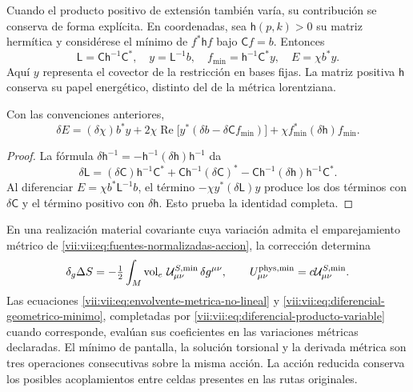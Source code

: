 Cuando el producto positivo de extensión también varía, su
contribución se conserva de forma explícita. En coordenadas, sea
\(\mathsf h(p,k)>0\) su matriz hermítica y considérese el mínimo
de \(f^*\mathsf h f\) bajo \(\mathsf C f=b\). Entonces
\begin{equation}
 \mathsf L=\mathsf C\mathsf h^{-1}\mathsf C^*,\quad
 y=\mathsf L^{-1}b,\quad
 f_{\min}=\mathsf h^{-1}\mathsf C^*y,\quad
 E=\chi b^*y.
 \label{vii:vii:eq:minimo-producto-variable}
\end{equation}
Aquí \(y\) representa el covector de la restricción en bases
fijas. La matriz positiva \(\mathsf h\) conserva su papel
energético, distinto del de la métrica lorentziana.

\begin{lemma}
\label{vii:vii:lem:producto-variable-extension}
Con las convenciones anteriores,
\begin{equation}
 \delta E=(\delta\chi)b^*y
   +2\chi\operatorname{Re}\bigl[y^*(\delta b-\delta\mathsf C f_{\min})\bigr]
   +\chi f_{\min}^*(\delta\mathsf h)f_{\min}.
 \label{vii:vii:eq:diferencial-producto-variable}
\end{equation}
\end{lemma}
\begin{proof}
La fórmula \(\delta\mathsf h^{-1}
=-\mathsf h^{-1}(\delta\mathsf h)\mathsf h^{-1}\) da
\[
 \delta\mathsf L=(\delta\mathsf C)\mathsf h^{-1}\mathsf C^*
 +\mathsf C\mathsf h^{-1}(\delta\mathsf C)^*
 -\mathsf C\mathsf h^{-1}(\delta\mathsf h)
                              \mathsf h^{-1}\mathsf C^*.
\]
Al diferenciar \(E=\chi b^*\mathsf L^{-1}b\), el término
\(-\chi y^*(\delta\mathsf L)y\) produce los dos términos
con \(\delta\mathsf C\) y el término positivo con
\(\delta\mathsf h\). Esto prueba la identidad completa.
\end{proof}

En una realización material covariante cuya variación admita el
emparejamiento métrico de
\eqref{vii:vii:eq:fuentes-normalizadas-accion}, la corrección determina
\begin{equation}
 \delta_g\Delta S
 =-\tfrac12\int_M\operatorname{vol}_e\,
          \mathcal U^{S,\min}_{\mu\nu}\,\delta g^{\mu\nu},
 \qquad U^{\rm phys,\min}_{\mu\nu}
                      =c\mathcal U^{S,\min}_{\mu\nu}.
 \label{vii:vii:eq:fuente-metrica-minimo-no-lineal}
\end{equation}
Las ecuaciones \eqref{vii:vii:eq:envolvente-metrica-no-lineal} y
\eqref{vii:vii:eq:diferencial-geometrico-minimo}, completadas por
\eqref{vii:vii:eq:diferencial-producto-variable} cuando corresponde,
evalúan sus coeficientes en las variaciones métricas declaradas.
El mínimo de pantalla, la solución torsional y la derivada métrica
son tres operaciones consecutivas sobre la misma acción.
La acción reducida conserva los posibles acoplamientos entre
celdas presentes en las rutas originales.

